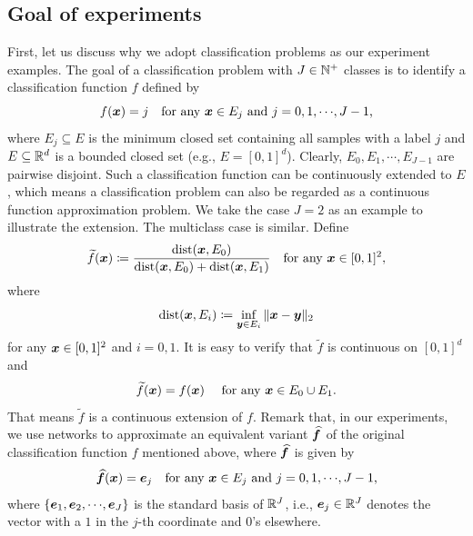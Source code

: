 \documentclass[nohyperref]{article}
\theoremstyle{plain}
\theoremstyle{definition}
\theoremstyle{remark}
\begin{document}
\subsection{Goal of experiments}
First, let us discuss why we adopt classification problems as our experiment examples. The goal of a classification problem with $J\in\N^+$ classes is to identify a classification function $f$ defined by 
\begin{equation*}
    f(\bmx)=j \quad \tn{for any $\bmx\in E_j$ and $j=0,1,\cdots,J-1$,}
\end{equation*}
where $E_j\subseteq E$ is the minimum closed set containing all samples with a label $j$ and $E\subseteq \R^d$ is a bounded closed set (e.g., $E=[0,1]^d$). 
Clearly, $E_0,E_1,\cdots,E_{J-1}$ are pairwise disjoint. Such a classification function can be continuously extended to $E$, which means a classification problem can also be regarded as a continuous function approximation problem.
We take the case $J=2$ as an example to illustrate the extension. The multiclass case is similar. Define 
\begin{equation*}
	\widetilde{f}({\bm{x}})\coloneqq \frac{\textnormal{dist}({\bm{x}},E_0)}{\textnormal{dist}({\bm{x}},E_0)+\textnormal{dist}({\bm{x}},E_1)} \quad \textnormal{for any ${\bm{x}}\in [0,1]^2$},
\end{equation*}
where 
\begin{equation*}
	\textnormal{dist}({\bm{x}},E_i)\coloneqq \inf_{{\bm{y}}\in E_i}\|{\bm{x}}-{\bm{y}}\|_2 
\end{equation*} 
for any ${\bm{x}}\in [0,1]^2$ and $i=0,1$.
It is easy to verify that $\widetilde{f}$ is continuous on $[0,1]^d$ and 
\begin{equation*}
    \widetilde{f}({\bm{x}})=f({\bm{x}})\quad \textnormal{ for any ${\bm{x}}\in E_0\cup E_1$.}
\end{equation*}
That means $\widetilde{f}$ is a continuous extension of $f$.
Remark that, in our experiments, we use networks to approximate an equivalent variant ${\widehat{\bm{f}}}$ of the original classification function $f$ mentioned above, where ${\widehat{\bm{f}}}$ is given by 
\begin{equation*}
    \hatbmf(\bmx)=\bme_j \quad \tn{for any $\bmx\in E_j$ and $j=0,1,\cdots,J-1$,}
\end{equation*}
where $\{\bme_1,\bme_2,\cdots,\bme_J\}$ is the standard basis of $\R^J$, i.e., $\bme_j\in\R^J$ denotes the vector with a $1$ in the $j$-th coordinate and $0$'s elsewhere.
\end{document}
